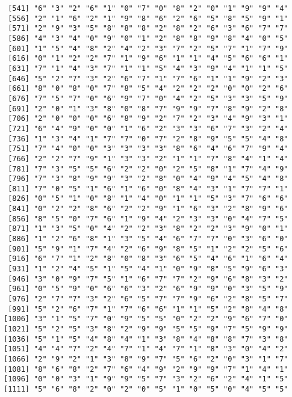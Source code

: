 \documentclass{article}
\begin{document}
\begin{itemize}
\begin{scriptsize}
\begin{verbatim}
 [541] "6" "3" "2" "6" "1" "0" "7" "0" "8" "2" "0" "1" "9" "9" "4"
 [556] "2" "1" "6" "2" "1" "9" "8" "6" "2" "6" "5" "8" "5" "9" "1"
 [571] "2" "9" "3" "5" "8" "8" "8" "2" "8" "2" "6" "3" "6" "7" "7"
 [586] "4" "3" "4" "0" "9" "0" "1" "2" "8" "8" "9" "8" "4" "0" "5"
 [601] "1" "5" "4" "8" "2" "4" "2" "3" "7" "2" "5" "7" "1" "7" "9"
 [616] "0" "1" "2" "2" "7" "1" "9" "6" "1" "1" "4" "5" "6" "6" "1"
 [631] "7" "1" "4" "3" "7" "1" "1" "5" "4" "3" "9" "4" "1" "1" "5"
 [646] "5" "2" "7" "3" "2" "6" "7" "1" "7" "6" "1" "1" "9" "2" "3"
 [661] "8" "0" "8" "0" "7" "8" "5" "4" "2" "2" "2" "0" "0" "2" "6"
 [676] "7" "5" "7" "0" "6" "9" "7" "0" "4" "2" "5" "3" "3" "5" "9"
 [691] "2" "0" "1" "3" "8" "0" "8" "7" "9" "9" "7" "8" "9" "2" "8"
 [706] "2" "0" "0" "0" "6" "8" "9" "2" "7" "2" "3" "4" "9" "3" "1"
 [721] "6" "4" "9" "0" "0" "1" "6" "2" "3" "3" "6" "7" "3" "2" "4"
 [736] "1" "3" "4" "1" "7" "7" "0" "7" "2" "8" "9" "5" "5" "4" "8"
 [751] "7" "4" "0" "0" "3" "3" "3" "3" "8" "6" "4" "6" "7" "9" "4"
 [766] "2" "2" "7" "9" "1" "3" "3" "2" "1" "1" "7" "8" "4" "1" "4"
 [781] "7" "3" "5" "5" "6" "2" "2" "0" "2" "5" "8" "1" "7" "4" "9"
 [796] "7" "3" "8" "9" "9" "3" "2" "8" "0" "4" "9" "4" "5" "4" "8"
 [811] "7" "0" "5" "1" "6" "1" "6" "0" "8" "4" "3" "1" "7" "7" "1"
 [826] "0" "5" "1" "0" "8" "1" "4" "0" "1" "1" "5" "3" "7" "6" "6"
 [841] "0" "2" "2" "8" "6" "2" "2" "9" "1" "6" "3" "2" "8" "9" "6"
 [856] "8" "5" "0" "7" "6" "1" "9" "4" "2" "3" "3" "0" "4" "7" "5"
 [871] "1" "3" "5" "0" "4" "2" "2" "3" "8" "2" "2" "3" "9" "0" "1"
 [886] "1" "2" "6" "8" "1" "3" "5" "4" "6" "7" "7" "0" "3" "6" "0"
 [901] "5" "9" "1" "7" "4" "2" "6" "9" "8" "5" "1" "2" "2" "5" "6"
 [916] "6" "7" "1" "2" "8" "0" "8" "3" "6" "5" "4" "6" "1" "6" "4"
 [931] "1" "2" "4" "5" "1" "5" "4" "1" "0" "9" "8" "5" "9" "6" "3"
 [946] "3" "0" "9" "7" "5" "1" "6" "7" "7" "2" "9" "6" "8" "3" "2"
 [961] "0" "5" "9" "0" "6" "6" "3" "2" "6" "9" "9" "0" "3" "5" "9"
 [976] "2" "7" "7" "3" "2" "6" "5" "7" "7" "9" "6" "2" "8" "5" "7"
 [991] "5" "2" "6" "7" "1" "7" "6" "6" "1" "1" "5" "2" "8" "4" "8"
[1006] "3" "1" "5" "7" "0" "9" "5" "5" "0" "2" "2" "9" "6" "7" "0"
[1021] "5" "2" "5" "3" "8" "2" "9" "9" "5" "5" "9" "7" "5" "9" "9"
[1036] "5" "1" "5" "4" "8" "4" "1" "3" "8" "4" "8" "8" "7" "3" "8"
[1051] "4" "4" "7" "2" "4" "7" "1" "4" "7" "1" "8" "3" "0" "4" "2"
[1066] "2" "9" "2" "1" "3" "8" "9" "7" "5" "6" "2" "0" "3" "1" "7"
[1081] "8" "6" "8" "2" "7" "6" "4" "9" "2" "9" "9" "7" "1" "4" "1"
[1096] "0" "0" "3" "1" "9" "9" "5" "7" "3" "2" "6" "2" "4" "1" "5"
[1111] "5" "6" "8" "2" "0" "2" "0" "5" "1" "0" "5" "0" "4" "5" "5"

\end{verbatim}
\end{scriptsize}
\end{itemize}
\end{document}
